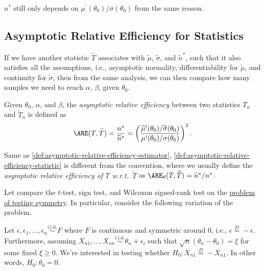 \begin{remark}
	\(n^{\ast} \) still only depends on \(\mu ^{\prime} (\theta _0) / \sigma (\theta _0)\) from the same reason.
\end{remark}

\subsection{Asymptotic Relative Efficiency for Statistics}
If we have another statistic \(\widetilde{T} \) associates with \(\widetilde{\mu} \), \(\widetilde{\sigma} \), and \(\widetilde{n} ^{\ast} \), such that it also satisfies all the assumptions, i.e., asymptotic normality, differentiability for \(\widetilde{\mu} \), and continuity for \(\widetilde{\sigma} \), then from the same analysis, we can then compare how many samples we need to reach \(\alpha \), \(\beta \), given \(\theta _0\).

\begin{definition}\label{def:asymptotic-relative-efficiency-statistic}
	Given \(\theta _0\), \(\alpha \), and \(\beta \), the \emph{asymptotic relative efficiency} between two statistics \(T_n\) and \(\widetilde{T} _n\) is defined as
	\[
		\ARE(T, \widetilde{T} )
		= \frac{n^{\ast} }{\widetilde{n} ^{\ast} }
		= \left( \frac{\widetilde{\mu} ^{\prime} (\theta _0) / \widetilde{\sigma} (\theta _0)}{\mu ^{\prime} (\theta _0) / \sigma (\theta _0)} \right) ^2.
	\]
\end{definition}

\begin{note}
	Same as \autoref{def:asymptotic-relative-efficiency-estimator}, \autoref{def:asymptotic-relative-efficiency-statistic} is different from the convention, where we usually define the \emph{asymptotic relative efficiency of \(T\) w.r.t.\ \(\widetilde{T} \)} as \(\ARE_\theta (T, \widetilde{T} ) = \widetilde{n} ^{\ast} / n^{\ast} \).
\end{note}

Let compare the \(t\)-test, sign test, and Wilcoxon signed-rank test on the \hyperref[prb:testing-symmetry]{problem of testing symmetry}. In particular, consider the following variation of the problem.

\begin{problem*}
	Let \(\epsilon , \epsilon _1, \dots, \epsilon _n \overset{\text{i.i.d.} }{\sim } F\) where \(F\) is continuous and symmetric around \(0\), i.e., \(\epsilon \overset{D}{=} -\epsilon \). Furthermore, assuming \(X_{n1}, \dots , X_{nn} \overset{\text{i.i.d.} }{\sim } \theta _n + \epsilon _i\) such that \(\sqrt{n} (\theta _n - \theta _0) = \xi \) for some fixed \(\xi \geq 0\). We're interested in testing whether \(H_0 \colon X_{n1} \overset{D}{=} -X_{n1}\). In other words, \(H_0 \colon \theta _0 = 0\).
\end{problem*}


